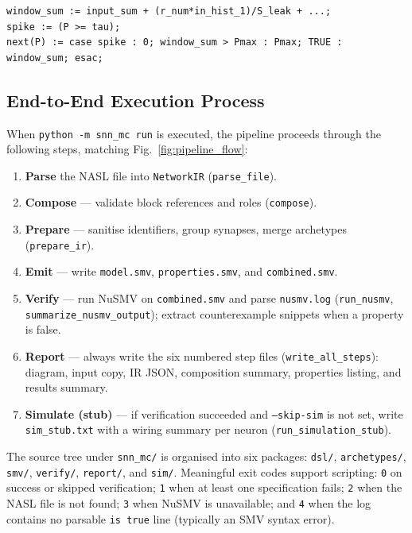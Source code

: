 \documentclass[
]{ceurart}
\begin{document}
\begin{lstlisting}[style=smvcode,caption={$\sigma$-window LIF update emitted by \texttt{lif\_module.py}.},label=lst:lif-smv]
window_sum := input_sum + (r_num*in_hist_1)/S_leak + ...;
spike := (P >= tau);
next(P) := case spike : 0; window_sum > Pmax : Pmax; TRUE : window_sum; esac;
\end{lstlisting}

\subsection{End-to-End Execution Process}
\label{subsec:end-to-end}

When \texttt{python -m snn\_mc run} is executed, the pipeline proceeds
through the following steps, matching Fig.~\ref{fig:pipeline_flow}:
\begin{enumerate}
\item \textbf{Parse} the \textsc{NASL} file into \texttt{NetworkIR} (\texttt{parse\_file}).
\item \textbf{Compose} --- validate block references and roles (\texttt{compose}).
\item \textbf{Prepare} --- sanitise identifiers, group synapses, merge
      archetypes (\texttt{prepare\_ir}).
\item \textbf{Emit} --- write \texttt{model.smv}, \texttt{properties.smv},
      and \texttt{combined.smv}.
\item \textbf{Verify} --- run NuSMV on \texttt{combined.smv} and parse
      \texttt{nusmv.log} (\texttt{run\_nusmv}, \texttt{summarize\_nusmv\_output});
      extract counterexample snippets when a property is false.
\item \textbf{Report} --- always write the six numbered step files
      (\texttt{write\_all\_steps}): diagram, input copy, IR JSON, composition
      summary, properties listing, and results summary.
\item \textbf{Simulate (stub)} --- if verification succeeded and
      \texttt{--skip-sim} is not set, write \texttt{sim\_stub.txt} with a
      wiring summary per neuron (\texttt{run\_simulation\_stub}).
\end{enumerate}

The source tree under \texttt{snn\_mc/} is organised into six packages:
\texttt{dsl/}, \texttt{archetypes/}, \texttt{smv/}, \texttt{verify/},
\texttt{report/}, and \texttt{sim/}. Meaningful exit codes support
scripting: \texttt{0} on success or skipped verification; \texttt{1} when at
least one specification fails; \texttt{2} when the \textsc{NASL} file is not
found; \texttt{3} when NuSMV is unavailable; and \texttt{4} when the log
contains no parsable \texttt{is true} line (typically an SMV syntax error).
\end{document}
